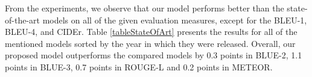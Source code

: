\documentclass[runningheads]{llncs}
\begin{document}
From the experiments, we observe that our model performs better than the state-of-the-art models on all of the given evaluation measures, except for the BLEU-1, BLEU-4, and CIDEr. Table \ref{tableStateOfArt} presents the results for all of the mentioned models sorted by the year in which they were released. Overall, our proposed model outperforms the compared models by 0.3 points in BLUE-2, 1.1 points in BLUE-3, 0.7 points in ROUGE-L and 0.2 points in METEOR.

\begin{table}[t]

\caption{A comparison of our proposed model with the recently published methods on the Visual Story-Telling dataset (VIST). Quantitative results were obtained using seven different automated measures of evaluation. ``-" indicates that the authors of the corresponding study did not publish the results. The higher scores represent higher accuracy and the results in bold represent the best scores.}
\label{tableStateOfArt}
\end{table}
\end{document}
